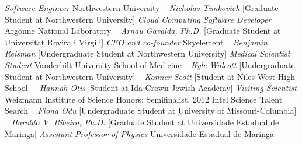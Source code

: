 \newline
    \textit{Software Engineer}
    \newline
    Northwestern University
    \newline
~
\Gap{}
\textit{Nicholas Timkovich}
    [Graduate Student at Northwestern University]
\newline
    \textit{Cloud Computing Software Developer}
    \newline
    Argonne National Laboratory
    \newline
~
\Gap{}
\textit{Arnau Gavalda, Ph.D.}
    [Graduate Student at Universitat Rovira i Virgili]
\newline
    \textit{CEO and co-founder}
    \newline
    Skyelement
    \newline
~
\Gap{}
\textit{Benjamin Reisman}
    [Undergraduate Student at Northwestern University]
\newline
    \textit{Medical Scientist Student}
    \newline
    Vanderbilt University School of Medicine
    \newline
~
\Gap{}
\textit{Kyle Walcott}
    [Undergraduate Student at Northwestern University]
\newline
~
\Gap{}
\textit{Konner Scott}
    [Student at Niles West High School]
\newline
~
\Gap{}
\textit{Hannah Otis}
    [Student at Ida Crown Jewish Academy]
\newline
    \textit{Visiting Scientist}
    \newline
    Weizmann Institute of Science
    \newline
    {\footnotesize Honors: Semifinalist, 2012 Intel Science Talent Search}
    \newline
~
\Gap{}
\textit{Fiona Odu}
    [Undergraduate Student at University of Missouri-Columbia]
\newline
~
\Gap{}
\textit{Haroldo V. Ribeiro, Ph.D.}
    [Graduate Student at Universidade Estadual de Maringa]
\newline
    \textit{Assistant Professor of Physics}
    \newline
    Universidade Estadual de Maringa
